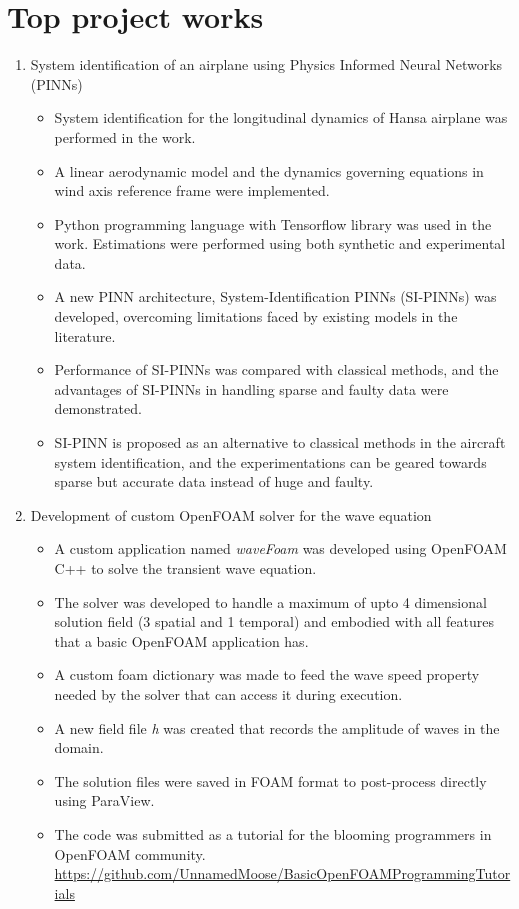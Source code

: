 \section{Top project works}
\begin{enumerate}
	\item System identification of an airplane using Physics Informed Neural Networks (PINNs)
		\begin{itemize}
			\item System identification for the longitudinal dynamics of Hansa airplane was performed in the work.
			\item A linear aerodynamic model and the dynamics governing equations in wind axis reference frame were implemented.
			\item Python programming language with Tensorflow library was used in the work. Estimations were performed using both synthetic and experimental data.
			\item A new PINN architecture, System-Identification PINNs (SI-PINNs) was developed,
				overcoming limitations faced by existing models in the literature.
			\item Performance of SI-PINNs was compared with classical methods, and the advantages of SI-PINNs in handling sparse and faulty data were demonstrated.
			\item SI-PINN is proposed as an alternative to classical methods in the aircraft system identification, and the experimentations can be geared
				towards sparse but accurate data instead of huge and faulty.
		\end{itemize}

	\item Development of custom OpenFOAM solver for the wave equation
		\begin{itemize}
			\item A custom application named \textit{waveFoam} was developed using OpenFOAM C++ to
				solve the transient wave equation.
			\item The solver was developed to handle a maximum of upto 4 dimensional solution field (3 spatial and 1 temporal) and embodied with all features that a basic OpenFOAM application has.
			\item A custom foam dictionary was made to feed the wave speed property needed by the solver that can access it during execution.
			\item A new field file \textit{h} was created that records the amplitude of waves in the domain.
			\item The solution files were saved in FOAM format to post-process directly using ParaView.
			\item The code was submitted as a tutorial for the blooming programmers in OpenFOAM community. \url{https://github.com/UnnamedMoose/BasicOpenFOAMProgrammingTutorials}
		\end{itemize}


\end{enumerate}
